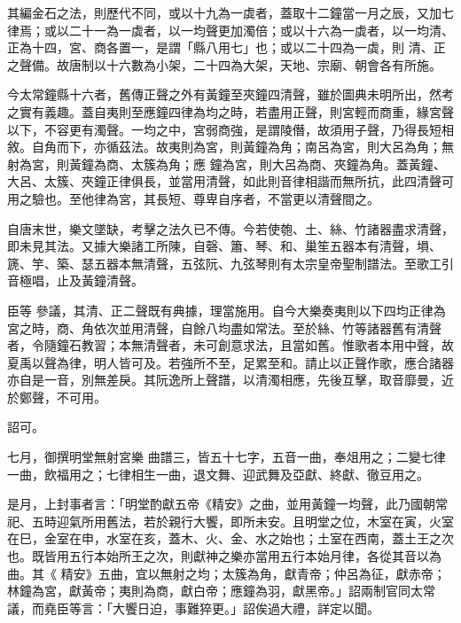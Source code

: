 \begin{pinyinscope}
 其編金石之法，則歷代不同，或以十九為一虡者，蓋取十二鐘當一月之辰，又加七律焉；或以二十一為一虡者，以一均聲更加濁倍；或以十六為一虡者，以一均清、正為十四，宮、商各置一，是謂「縣八用七」也；或以二十四為一虡，則
 清、正之聲備。故唐制以十六數為小架，二十四為大架，天地、宗廟、朝會各有所施。



 今太常鐘縣十六者，舊傳正聲之外有黃鐘至夾鐘四清聲，雖於圖典未明所出，然考之實有義趣。蓋自夷則至應鐘四律為均之時，若盡用正聲，則宮輕而商重，緣宮聲以下，不容更有濁聲。一均之中，宮弱商強，是謂陵僭，故須用子聲，乃得長短相敘。自角而下，亦循茲法。故夷則為宮，則黃鐘為角；南呂為宮，則大呂為角；無射為宮，則黃鐘為商、太簇為角；應
 鐘為宮，則大呂為商、夾鐘為角。蓋黃鐘、大呂、太簇、夾鐘正律俱長，並當用清聲，如此則音律相諧而無所抗，此四清聲可用之驗也。至他律為宮，其長短、尊卑自序者，不當更以清聲間之。



 自唐末世，樂文墜缺，考擊之法久已不傳。今若使匏、土、絲、竹諸器盡求清聲，即未見其法。又據大樂諸工所陳，自磬、簫、琴、和、巢笙五器本有清聲，塤、篪、竽、築、瑟五器本無清聲，五弦阮、九弦琴則有太宗皇帝聖制譜法。至歌工引音極唱，止及黃鐘清聲。



 臣等
 參議，其清、正二聲既有典據，理當施用。自今大樂奏夷則以下四均正律為宮之時，商、角依次並用清聲，自餘八均盡如常法。至於絲、竹等諸器舊有清聲者，令隨鐘石教習；本無清聲者，未可創意求法，且當如舊。惟歌者本用中聲，故夏禹以聲為律，明人皆可及。若強所不至，足累至和。請止以正聲作歌，應合諸器亦自是一音，別無差戾。其阮逸所上聲譜，以清濁相應，先後互擊，取音靡曼，近於鄭聲，不可用。



 詔可。



 七月，御撰明堂無射宮樂
 曲譜三，皆五十七字，五音一曲，奉俎用之；二變七律一曲，飲福用之；七律相生一曲，退文舞、迎武舞及亞獻、終獻、徹豆用之。



 是月，上封事者言：「明堂酌獻五帝《精安》之曲，並用黃鐘一均聲，此乃國朝常祀、五時迎氣所用舊法，若於親行大饗，即所未安。且明堂之位，木室在寅，火室在巳，金室在申，水室在亥，蓋木、火、金、水之始也；土室在西南，蓋土王之次也。既皆用五行本始所王之次，則獻神之樂亦當用五行本始月律，各從其音以為曲。其《
 精安》五曲，宜以無射之均；太簇為角，獻青帝；仲呂為征，獻赤帝；林鐘為宮，獻黃帝；夷則為商，獻白帝；應鐘為羽，獻黑帝。」詔兩制官同太常議，而堯臣等言：「大饗日迫，事難猝更。」詔俟過大禮，詳定以聞。




\end{pinyinscope}
